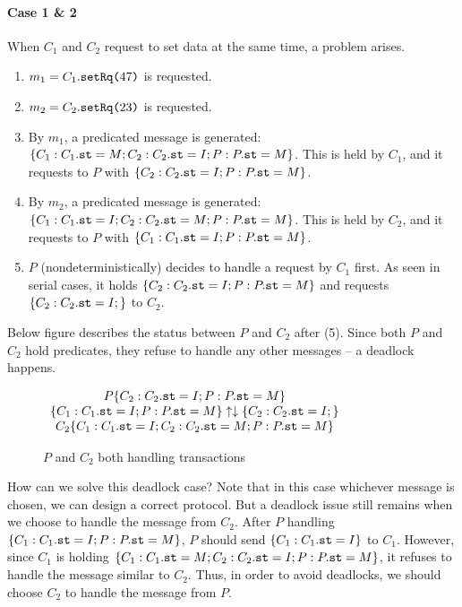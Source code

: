 \documentclass[format=manuscript]{acmart}
\begin{document}
\paragraph{Case 1 \& 2}
When $C_1$ and $C_2$ request to set data at the same time, a problem arises.

\begin{enumerate}
\item $m_1 = C_1.\texttt{setRq(}47\texttt{)}$ is requested.
\item $m_2 = C_2.\texttt{setRq(}23\texttt{)}$ is requested.
\item By $m_1$, a predicated message is generated: $\{ C_1: C_1.\texttt{st} = M; C_2:
  C_2.\texttt{st} = I; P: P.\texttt{st} = M \}$. This is held by $C_1$, and it requests to
  $P$ with $\{ C_2: C_2.\texttt{st} = I; P: P.\texttt{st} = M \}$.
\item By $m_2$, a predicated message is generated: $\{ C_1: C_1.\texttt{st} = I; C_2:
  C_2.\texttt{st} = M; P: P.\texttt{st} = M \}$. This is held by $C_2$, and it requests to
  $P$ with $\{ C_1: C_1.\texttt{st} = I; P: P.\texttt{st} = M \}$.
\item $P$ (nondeterministically) decides to handle a request by $C_1$ first. As
  seen in serial cases, it holds $\{ C_2: C_2.\texttt{st} = I; P: P.\texttt{st} = M \}$
  and requests $\{ C_2: C_2.\texttt{st} = I; \}$ to $C_2$.
\end{enumerate}

Below figure describes the status between $P$ and $C_2$ after (5). Since both
$P$ and $C_2$ hold predicates, they refuse to handle any other messages -- a
deadlock happens.

\begin{figure}[h]
  \begin{math}
    \begin{array}{c}
      P \{ C_2: C_2.\texttt{st} = I; P: P.\texttt{st} = M \} \\
      \{ C_1: C_1.\texttt{st} = I; P: P.\texttt{st} = M \} \uparrow
      \downarrow \{ C_2: C_2.\texttt{st} = I; \} \\
      C_2 \{ C_1: C_1.\texttt{st} = I; C_2: C_2.\texttt{st} = M; P: P.\texttt{st} = M \}
    \end{array}
  \end{math}
  \caption{$P$ and $C_2$ both handling transactions}
  \label{fig:deadlock}
\end{figure}

How can we solve this deadlock case? Note that in this case whichever message is
chosen, we can design a correct protocol. But a deadlock issue still remains
when we choose to handle the message from $C_2$. After $P$ handling $\{ C_1:
C_1.\texttt{st} = I; P: P.\texttt{st} = M \}$, $P$ should send $\{ C_1: C_1.\texttt{st} = I \}$
to $C_1$. However, since $C_1$ is holding $\{ C_1: C_1.\texttt{st} = M; C_2:
C_2.\texttt{st} = I; P: P.\texttt{st} = M \}$, it refuses to handle the message similar to
$C_2$. Thus, in order to avoid deadlocks, we should choose $C_2$ to handle the
message from $P$.
\end{document}
